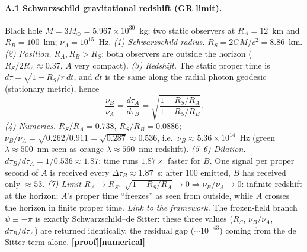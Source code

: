 \documentclass[11pt,a4paper]{article}
\newcommand{\st}[1]{\textbf{\textcolor{blue!45!black}{[#1]}}}
\begin{document}
\paragraph{A.1 Schwarzschild gravitational redshift (GR limit).}
Black hole $M=3M_\odot=5.967\times10^{30}$~kg; two static observers at $R_A=12$~km and $R_B=100$~km; $\nu_A=10^{15}$~Hz.
\emph{(1) Schwarzschild radius.} $R_S=2GM/c^2=8.86$~km.
\emph{(2) Position.} $R_A,R_B>R_S$: both observers are outside the horizon ($R_S/2R_A\approx0.37$, $A$ very compact).
\emph{(3) Redshift.} The static proper time is $d\tau=\sqrt{1-R_S/r}\,dt$, and $dt$ is the same along the radial photon geodesic (stationary metric), hence
\begin{equation}
\frac{\nu_B}{\nu_A}=\frac{d\tau_A}{d\tau_B}=\sqrt{\frac{1-R_S/R_A}{1-R_S/R_B}}. \tag{A.1}
\end{equation}
\emph{(4) Numerics.} $R_S/R_A=0.738$, $R_S/R_B=0.0886$; $\nu_B/\nu_A=\sqrt{0.262/0.911}=\sqrt{0.287}\approx\boxed{0.536}$, i.e.\ $\nu_B\approx5.36\times10^{14}$~Hz (green $\lambda\!\approx\!500$~nm seen as orange $\lambda\!\approx\!560$~nm: redshift).
\emph{(5--6) Dilation.} $d\tau_B/d\tau_A=1/0.536\approx\boxed{1.87}$: time runs $1.87\times$ faster for $B$. One signal per proper second of $A$ is received every $\Delta\tau_B\approx1.87$~s; after 100 emitted, $B$ has received only $\approx53$.
\emph{(7) Limit $R_A\to R_S$.} $\sqrt{1-R_S/R_A}\to0\Rightarrow\nu_B/\nu_A\to0$: infinite redshift at the horizon; $A$'s proper time ``freezes'' as seen from outside, while $A$ crosses the horizon in finite proper time.
\emph{Link to the framework.} The frozen-field branch $\psi\equiv-\pi$ is exactly Schwarzschild--de Sitter: these three values ($R_S$, $\nu_B/\nu_A$, $d\tau_B/d\tau_A$) are returned identically, the residual gap ($\sim10^{-43}$) coming from the de Sitter term alone. \st{proof}\st{numerical}
\end{document}
